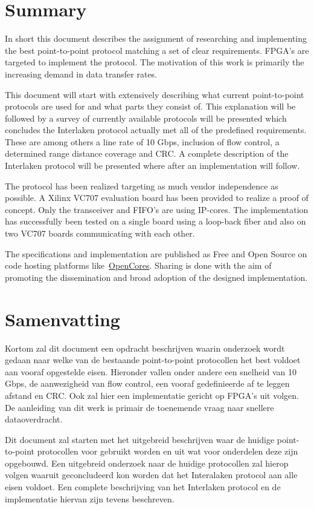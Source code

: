 \section*{Summary}

In short this document describes the assignment of researching and implementing the best point-to-point protocol matching a set of clear requirements. FPGA's are targeted to implement the protocol. The motivation of this work is primarily the increasing demand in data transfer rates. 

This document will start with extensively describing what current point-to-point protocols are used for and what parts they consist of. This explanation will be followed by a survey of currently available protocols will be presented which concludes the Interlaken protocol actually met all of the predefined requirements. These are among others a line rate of 10 Gbps, inclusion of flow control, a determined range distance coverage and CRC. A complete description of the Interlaken protocol will be presented where after an implementation will follow.

The protocol has been realized targeting as much vendor independence as possible. A Xilinx VC707 evaluation board has been provided to realize a proof of concept. Only the transceiver and FIFO's are using IP-cores. The implementation has successfully been tested on a single board using a loop-back fiber and also on two VC707 boards communicating with each other.

The specifications and implementation are published as Free and Open Source on code hosting platforms like~\href{https://opencores.org/}{OpenCores}. Sharing is done with the aim of promoting the dissemination and broad adoption of the designed implementation.


\section*{Samenvatting}
Kortom zal dit document een opdracht beschrijven waarin onderzoek wordt gedaan naar welke van de bestaande point-to-point protocollen het best voldoet aan vooraf opgestelde eisen. Hieronder vallen onder andere een snelheid van 10 Gbps, de aanwezigheid van flow control, een vooraf gedefinieerde af te leggen afstand en CRC. Ook zal hier een implementatie gericht op FPGA's uit volgen. De aanleiding van dit werk is primair de toenemende vraag naar snellere dataoverdracht.

Dit document zal starten met het uitgebreid beschrijven waar de huidige point-to-point protocollen voor gebruikt worden en uit wat voor onderdelen deze zijn opgebouwd. Een uitgebreid onderzoek naar de huidige protocollen zal hierop volgen waaruit geconcludeerd kon worden dat het Interalaken protocol aan alle eisen voldoet. Een complete beschrijving van het Interlaken protocol en de implementatie hiervan zijn tevens beschreven.


